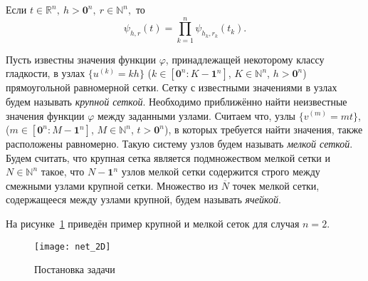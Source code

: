 Если $t\in\mathbb{R}^n,\  h>\mathbf{0}^n,\ r\in\mathbb{N}^n,$ то
\begin{equation*}
  \psi_{h,r}(t)=\prod_{k=1}^n\psi_{h_k,r_k}(t_k).
\end{equation*}


Пусть известны значения  функции $\varphi$, принадлежащей некоторому классу гладкости, 
в  узлах $\{u^{(k)}=kh\}$ ($k\in [\mathbf{0}^n : K-\mathbf{1}^n]$, $K\in \mathbb{N}^n$,
$h>\mathbf{0}^n$) прямоугольной
равномерной сетки. 
Сетку с известными значениями в узлах будем называть \textit{крупной сеткой}.
Необходимо приближённо найти неизвестные значения
функции $\varphi$ между заданными узлами.
Считаем что, узлы
$ \{v^{(m)}=mt\}$,  ($m\in [\mathbf{0}^n : M-\mathbf{1}^n]$,
$M\in \mathbb{N}^n$, $t>\mathbf{0}^n$), 
в которых требуется найти значения, 
также расположены
равномерно.
Такую  систему узлов %
будем называть
\textit{мелкой сеткой}.
Будем считать, что крупная сетка является подмножеством мелкой сетки и
$N\in\mathbb{N}^n$ такое, что $N-\mathbf{1}^n$ узлов мелкой сетки содержится строго между
смежными узлами крупной сетки.
Множество из $\overline{N}$ точек мелкой сетки, содержащееся между узлами крупной, будем называть
\textit{ячейкой}.

На рисунке~\ref{fig:net_common} приведён пример крупной и мелкой сеток
для случая $n=2$.
\begin{figure}[h!]
  \centering
  \texttt{[image: net\_2D]}
  \caption{Постановка задачи}
  \label{fig:net_common}
\end{figure}




